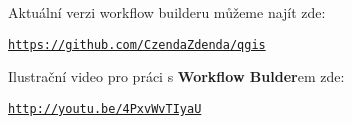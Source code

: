 Aktuální verzi workflow builderu můžeme najít zde:

\begin{center}
	\href{https://github.com/CzendaZdenda/qgis}{\texttt{https://github.com/CzendaZdenda/qgis}}
\end{center}

Ilustrační video pro práci s \textbf{Workflow Bulder}em zde:

\begin{center}
	\href{http://youtu.be/4PxvWvTIyaU}{\texttt{http://youtu.be/4PxvWvTIyaU}}
\end{center}
